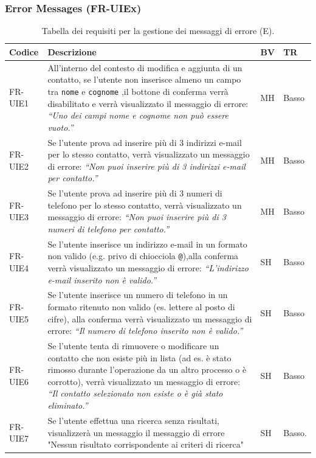 \documentclass[a4paper,12pt]{article}
\begin{document}
    \subsubsection{Error Messages (FR-UIEx)}
    \begin{table}[H]
        \centering
        \begin{tabular}{|l|p{8cm}|l|l|}
            \hline
            \textbf{Codice} & \textbf{Descrizione} & \textbf{BV} & \textbf{TR} \\
            \hline
            FR-UIE1 &
            All'interno del contesto di modifica e aggiunta di un contatto,
            se l'utente non inserisce almeno un campo tra \texttt{nome} e \texttt{cognome}
            ,il bottone di conferma verrà disabilitato e  verrà visualizzato il messaggio di errore:
            \textit{“Uno dei campi nome e cognome non può essere vuoto.”} & MH & Basso \\
            \hline

            FR-UIE2 &
            Se l'utente prova ad inserire più di 3 indirizzi e-mail per lo stesso contatto,
            verrà visualizzato un messaggio di errore:
            \textit{“Non puoi inserire più di 3 indirizzi e-mail per contatto.”} & MH & Basso \\
            \hline

            FR-UIE3 &
            Se l'utente prova ad inserire più di 3 numeri di telefono per lo stesso contatto,
            verrà visualizzato un messaggio di errore:
            \textit{“Non puoi inserire più di 3 numeri di telefono per contatto.”} & MH & Basso \\
            \hline

            FR-UIE4 &
            Se l'utente inserisce un indirizzo e-mail in un formato non valido
            (e.g. privo di chiocciola \texttt{@}),alla conferma verrà visualizzato un messaggio di errore:
            \textit{“L’indirizzo e-mail inserito non è valido.”} & SH & Basso \\
            \hline

            FR-UIE5 &
            Se l'utente inserisce un numero di telefono in un formato ritenuto non valido
            (es. lettere al posto di cifre), alla conferma verrà visualizzato un messaggio di errore:
            \textit{“Il numero di telefono inserito non è valido.”} & SH & Basso \\
            \hline

            FR-UIE6 &
            Se l'utente tenta di rimuovere o modificare un contatto che non esiste più in lista
            (ad es. è stato rimosso durante l’operazione da un altro processo o è corrotto),
            verrà visualizzato un messaggio di errore:
            \textit{“Il contatto selezionato non esiste o è già stato eliminato.”} & SH & Basso \\
            \hline
            FR-UIE7 & Se l'utente effettua una ricerca senza risultati, visualizzerà un messaggio il messaggio di errore "Nessun risultato corrispondente ai criteri di ricerca" & SH & Basso. \\ \hline
        \end{tabular}
        \caption{Tabella dei requisiti per la gestione dei messaggi di errore (E).}
    \end{table}
\end{document}
